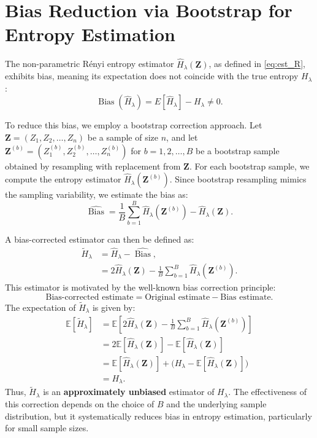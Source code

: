\documentclass[11pt,]{article}
\begin{document}
\section{Bias Reduction via Bootstrap for Entropy Estimation}

The non-parametric Rényi entropy estimator
\(\widehat{H}_\lambda(\bm{Z})\), as defined in \eqref{eq:est_R},
exhibits bias, meaning its expectation does not coincide with the true
entropy \(H_\lambda\): \begin{equation}
\operatorname{Bias}(\widehat{H}_\lambda) = {E}[\widehat{H}_\lambda] - H_\lambda \neq 0.
\end{equation}

To reduce this bias, we employ a bootstrap correction approach. Let
\(\bm{Z} = (Z_1, Z_2, \dots, Z_n)\) be a sample of size \(n\), and let
\(\bm{Z}^{(b)} = (Z_1^{(b)}, Z_2^{(b)}, \dots, Z_n^{(b)})\) for
\(b = 1, 2, \dots, B\) be a bootstrap sample obtained by resampling with
replacement from \(\bm{Z}\). For each bootstrap sample, we compute the
entropy estimator \(\widehat{H}_\lambda(\bm{Z}^{(b)})\). Since bootstrap
resampling mimics the sampling variability, we estimate the bias as:
\begin{equation}
\widehat{\operatorname{Bias}} = \frac{1}{B} \sum_{b=1}^{B} \widehat{H}_\lambda(\bm{Z}^{(b)}) - \widehat{H}_\lambda(\bm{Z}).
\end{equation}

A bias-corrected estimator can then be defined as: \begin{align}
\widetilde{H}_\lambda &= \widehat{H}_\lambda - \widehat{\operatorname{Bias}},\\
&= 2\widehat{H}_\lambda(\bm{Z}) - \frac{1}{B} \sum_{b=1}^{B} \widehat{H}_\lambda(\bm{Z}^{(b)}).
\end{align} This estimator is motivated by the well-known bias
correction principle: \begin{equation}
\text{Bias-corrected estimate} = \text{Original estimate} - \text{Bias estimate}.
\end{equation} The expectation of \(\widetilde{H}_\lambda\) is given by:
\begin{align}
\mathbb{E}[\widetilde{H}_\lambda] &= \mathbb{E}[2\widehat{H}_\lambda(\bm{Z}) - \frac{1}{B} \sum_{b=1}^{B} \widehat{H}_\lambda(\bm{Z}^{(b)})]\\
&= 2\mathbb{E}[\widehat{H}_\lambda(\bm{Z})] - \mathbb{E}[\widehat{H}_\lambda(\bm{Z})]\\
&= \mathbb{E}[\widehat{H}_\lambda(\bm{Z})] + \big( H_\lambda - \mathbb{E}[\widehat{H}_\lambda(\bm{Z})] \big)\\
&= H_\lambda.
\end{align} Thus, \(\widetilde{H}_\lambda\) is an \textbf{approximately
unbiased} estimator of \(H_\lambda\). The effectiveness of this
correction depends on the choice of \(B\) and the underlying sample
distribution, but it systematically reduces bias in entropy estimation,
particularly for small sample sizes.
\end{document}
